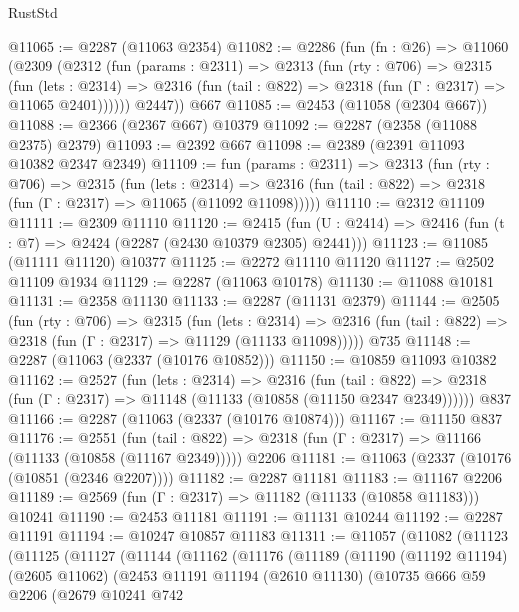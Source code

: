 \begin{lexlean}{RustStd}
\begin{coremodule}
@11065 := @2287 (@11063 @2354)
@11082 := @2286
    (fun (fn : @26) =>
    @11060
      (@2309
        (@2312
          (fun (params : @2311) =>
          @2313
            (fun (rty : @706) =>
            @2315
              (fun (lets : @2314) =>
              @2316 (fun (tail : @822) => @2318 (fun (Γ : @2317) => @11065 @2401))))))
        @2447))
    @667
@11085 := @2453 (@11058 (@2304 @667))
@11088 := @2366 (@2367 @667) @10379
@11092 := @2287 (@2358 (@11088 @2375) @2379)
@11093 := @2392 @667
@11098 := @2389 (@2391 @11093 @10382 @2347 @2349)
@11109 := fun (params : @2311) =>
  @2313
    (fun (rty : @706) =>
    @2315
      (fun (lets : @2314) =>
      @2316 (fun (tail : @822) => @2318 (fun (Γ : @2317) => @11065 (@11092 @11098)))))
@11110 := @2312 @11109
@11111 := @2309 @11110
@11120 := @2415
    (fun (U : @2414) => @2416 (fun (t : @7) => @2424 (@2287 (@2430 @10379 @2305) @2441)))
@11123 := @11085 (@11111 @11120) @10377
@11125 := @2272 @11110 @11120
@11127 := @2502 @11109 @1934
@11129 := @2287 (@11063 @10178)
@11130 := @11088 @10181
@11131 := @2358 @11130
@11133 := @2287 (@11131 @2379)
@11144 := @2505
    (fun (rty : @706) =>
    @2315
      (fun (lets : @2314) =>
      @2316 (fun (tail : @822) => @2318 (fun (Γ : @2317) => @11129 (@11133 @11098)))))
    @735
@11148 := @2287 (@11063 (@2337 (@10176 @10852)))
@11150 := @10859 @11093 @10382
@11162 := @2527
    (fun (lets : @2314) =>
    @2316
      (fun (tail : @822) =>
      @2318 (fun (Γ : @2317) => @11148 (@11133 (@10858 (@11150 @2347 @2349))))))
    @837
@11166 := @2287 (@11063 (@2337 (@10176 @10874)))
@11167 := @11150 @837
@11176 := @2551
    (fun (tail : @822) => @2318 (fun (Γ : @2317) => @11166 (@11133 (@10858 (@11167 @2349)))))
    @2206
@11181 := @11063 (@2337 (@10176 (@10851 (@2346 @2207))))
@11182 := @2287 @11181
@11183 := @11167 @2206
@11189 := @2569 (fun (Γ : @2317) => @11182 (@11133 (@10858 @11183))) @10241
@11190 := @2453 @11181
@11191 := @11131 @10244
@11192 := @2287 @11191
@11194 := @10247 @10857 @11183
@11311 := @11057
    (@11082
      (@11123
        (@11125
          (@11127
            (@11144
              (@11162
                (@11176
                  (@11189
                    (@11190
                      (@11192 @11194)
                      (@2605 @11062)
                      (@2453
                        @11191
                        @11194
                        (@2610 @11130)
                        (@10735
                          @666
                          @59
                          @2206
                          (@2679
                            @10241
                            @742

\end{coremodule}
\end{lexlean}
